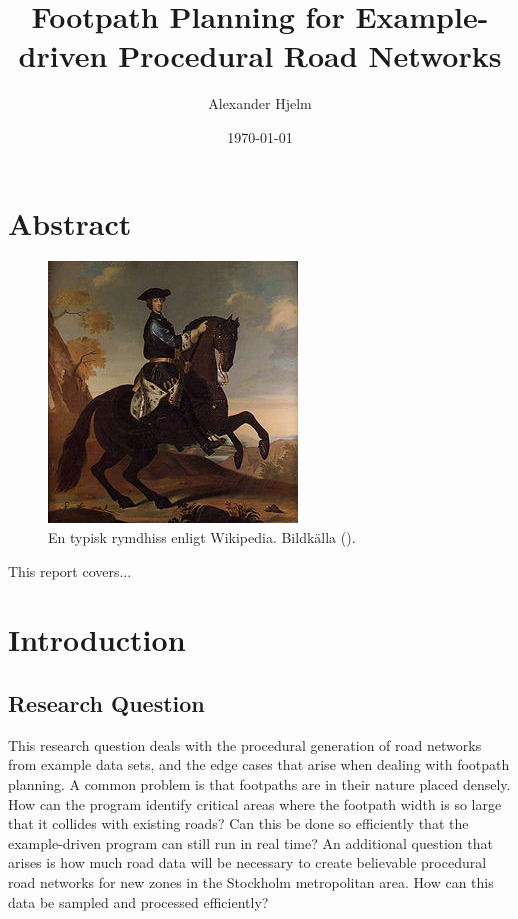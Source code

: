 \documentclass[a4paper]{article}
\title{Footpath Planning for Example-driven Procedural Road Networks}
\author{Alexander Hjelm}
\date{\today}
\begin{document}
\maketitle

\section{Abstract}

\begin{figure}[H]
\centering
\includegraphics[height=0.5\textheight]{test_image}
\caption{En typisk rymdhiss enligt Wikipedia. Bildkälla (\cite{sampleitem1}).}
\label{fig:space}
\end{figure}

This report covers... \cite{sampleitem2}

\section{Introduction}

\subsection{Research Question}

This research question deals with the procedural generation of road networks from example data sets, and the edge cases that arise when dealing with footpath planning. A common problem is that footpaths are in their nature placed densely. How can the program identify critical areas where the footpath width is so large that it collides with existing roads? Can this be done so efficiently that the example-driven program can still run in real time? An additional question that arises is how much road data will be necessary to create believable procedural road networks for new zones in the Stockholm metropolitan area. How can this data be sampled and processed efficiently?
\end{document}
